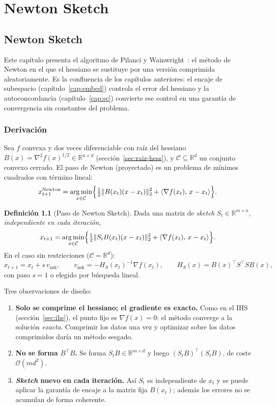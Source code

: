 \documentclass[11pt,a4paper,oneside]{book}
\theoremstyle{definition}
\newtheorem{definicion}[teorema]{Definición}
\theoremstyle{remark}
\newcommand{\R}{\mathbb{R}}
\newcommand{\cO}{\mathcal{O}}
\newcommand{\cC}{\mathcal{C}}
\newcommand{\T}{^{\top}}
\newcommand{\nrm}[1]{\lVert #1\rVert}
\newcommand{\ip}[2]{\langle #1,\, #2\rangle}
\DeclareMathOperator*{\argmin}{arg\,min}
\newcommand{\vnsk}{v_{\mathrm{nsk}}}
\begin{document}
\part{Newton Sketch}
\chapter{Newton Sketch}\label{cap:ns}

Este capítulo presenta el algoritmo de Pilanci y Wainwright~\cite{PW17}: el método de Newton en el que el
hessiano se sustituye por una versión comprimida aleatoriamente. Es la confluencia de los capítulos
anteriores: el encaje de subespacio (capítulo~\ref{cap:embed}) controla el error del hessiano y la
autoconcordancia (capítulo~\ref{cap:sc}) convierte ese control en una garantía de convergencia sin constantes
del problema.

\section{Derivación}

Sea $f$ convexa y dos veces diferenciable con raíz del hessiano $B(x)=\nabla^2 f(x)^{1/2}\in\R^{n\times d}$
(sección~\ref{sec:raiz-hess}), y $\cC\subseteq\R^d$ un conjunto convexo cerrado. El paso de Newton (proyectado) es
un problema de mínimos cuadrados con término lineal:
\[ x_{t+1}^{\mathrm{Newton}}=\argmin_{x\in\cC}\Bigl\{\tfrac12\nrm{B(x_t)(x-x_t)}_2^2+\ip{\nabla f(x_t)}{x-x_t}\Bigr\}. \]

\begin{definicion}[Paso de Newton Sketch]\label{def:ns}
Dada una matriz de \emph{sketch} $S_t\in\R^{m\times n}$, \emph{independiente en cada iteración},
\begin{equation}\label{eq:ns}
  x_{t+1}=\argmin_{x\in\cC}\Bigl\{\tfrac12\nrm{S_tB(x_t)(x-x_t)}_2^2+\ip{\nabla f(x_t)}{x-x_t}\Bigr\}.
\end{equation}
En el caso sin restricciones ($\cC=\R^d$):
\begin{equation}\label{eq:ns-unc}
  x_{t+1}=x_t+s\,\vnsk,\qquad\vnsk=-H_S(x_t)^{-1}\nabla f(x_t),\qquad H_S(x)=B(x)\T S\T SB(x),
\end{equation}
con paso $s=1$ o elegido por búsqueda lineal.
\end{definicion}

Tres observaciones de diseño:
\begin{enumerate}
  \item \textbf{Solo se comprime el hessiano; el gradiente es exacto.} Como en el IHS (sección~\ref{sec:ihs}), el
        punto fijo es $\nabla f(x)=0$: el método converge a la solución \emph{exacta}. Comprimir los datos una vez y
        optimizar sobre los datos comprimidos daría un método sesgado.
  \item \textbf{No se forma $B\T B$.} Se forma $S_tB\in\R^{m\times d}$ y luego $(S_tB)\T(S_tB)$, de coste $\cO(md^2)$.
  \item \textbf{\emph{Sketch} nuevo en cada iteración.} Así $S_t$ es independiente de $x_t$ y se puede aplicar la
        garantía de encaje a la matriz fija $B(x_t)$; además los errores no se acumulan de forma coherente.
\end{enumerate}
\end{document}
